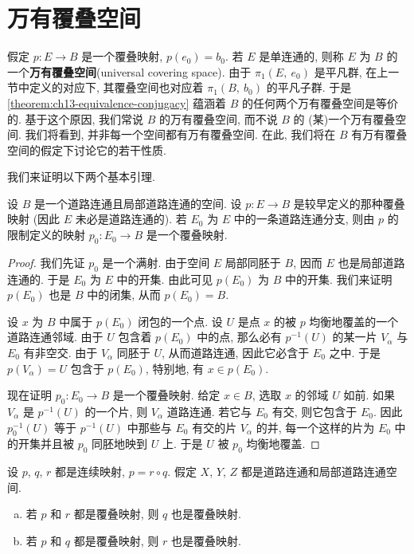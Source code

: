 ﻿\section{万有覆叠空间}
\label{ch13-sec80}

假定 $p\colon E\to B$ 是一个覆叠映射, $p(e_{0})=b_{0}$. 若 $E$ 是单连通的, 则称 $E$ 为 $B$ 的一个\textbf{万有覆叠空间}(universal covering space). 由于 $\pi_{1}(E,\ e_{0})$ 是平凡群, 在上一节中定义的对应下, 其覆叠空间也对应着 $\pi_{1}(B,\ b_{0})$ 的平凡子群. 于是 \cref{theorem:ch13-equivalence-conjugacy} 蕴涵着 $B$ 的任何两个万有覆叠空间是等价的. 基于这个原因, 我们常说 $B$ 的万有覆叠空间, 而不说 $B$ 的 (某)一个万有覆叠空间. 我们将看到, 并非每一个空间都有万有覆叠空间. 在此, 我们将在 $B$ 有万有覆叠空间的假定下讨论它的若干性质.

我们来证明以下两个基本引理.

\begin{lemma}[道路连通分支诱导覆叠映射]
\label{lemma:ch13-path-component-covering}
设 $B$ 是一个道路连通且局部道路连通的空间. 设 $p\colon E\to B$ 是较早定义的那种覆叠映射 (因此 $E$ 未必是道路连通的). 若 $E_{0}$ 为 $E$ 中的一条道路连通分支, 则由 $p$ 的限制定义的映射 $p_{0}\colon E_{0}\to B$ 是一个覆叠映射.
\end{lemma}

\begin{proof}
我们先证 $p_{0}$ 是一个满射. 由于空间 $E$ 局部同胚于 $B$, 因而 $E$ 也是局部道路连通的. 于是 $E_{0}$ 为 $E$ 中的开集. 由此可见 $p(E_{0})$ 为 $B$ 中的开集. 我们来证明 $p(E_{0})$ 也是 $B$ 中的闭集, 从而 $p(E_{0})=B$.

设 $x$ 为 $B$ 中属于 $p(E_{0})$ 闭包的一个点. 设 $U$ 是点 $x$ 的被 $p$ 均衡地覆盖的一个道路连通邻域. 由于 $U$ 包含着 $p(E_{0})$ 中的点, 那么必有 $p^{-1}(U)$ 的某一片 $V_{\alpha}$ 与 $E_{0}$ 有非空交. 由于 $V_{\alpha}$ 同胚于 $U$, 从而道路连通, 因此它必含于 $E_{0}$ 之中. 于是 $p(V_{\alpha})=U$ 包含于 $p(E_{0})$, 特别地, 有 $x\in p(E_{0})$.

现在证明 $p_{0}\colon E_{0}\to B$ 是一个覆叠映射. 给定 $x\in B$, 选取 $x$ 的邻域 $U$ 如前. 如果 $V_{\alpha}$ 是 $p^{-1}(U)$ 的一个片, 则 $V_{\alpha}$ 道路连通. 若它与 $E_{0}$ 有交, 则它包含于 $E_{0}$. 因此 $p_{0}^{-1}(U)$ 等于 $p^{-1}(U)$ 中那些与 $E_{0}$ 有交的片 $V_{\alpha}$ 的并, 每一个这样的片为 $E_{0}$ 中的开集并且被 $p_{0}$ 同胚地映到 $U$ 上. 于是 $U$ 被 $p_{0}$ 均衡地覆盖.
\end{proof}

\begin{lemma}[覆叠映射的合成]
\label{lemma:ch13-composition-covering}
设 $p$, $q$, $r$ 都是连续映射, $p=r\circ q$. 假定 $X$, $Y$, $Z$ 都是道路连通和局部道路连通空间.
\begin{enumerate}[(a)]
\item 若 $p$ 和 $r$ 都是覆叠映射, 则 $q$ 也是覆叠映射.
\item 若 $p$ 和 $q$ 都是覆叠映射, 则 $r$ 也是覆叠映射.
\end{enumerate}
\end{lemma}

